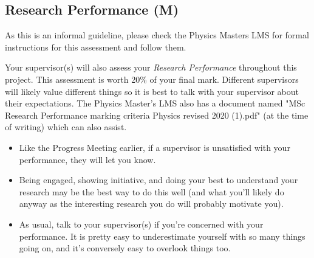 \documentclass[11pt, oneside, a4paper]{article}
\newcommand{\tipscolor}{ForestGreen}
\begin{document}
\subsection*{Research Performance (M)}\label{ResearchPerformance}

\begin{tcolorbox}[colback=red!5!white,colframe=red!50!white,title={IMPORTANT}]
    As this is an informal guideline, please check the Physics Masters LMS for formal instructions for this assessment and follow them. 
\end{tcolorbox} 

Your supervisor(s) will also assess your \textit{Research Performance} throughout this project. 
This assessment is worth 20\% of your final mark. 
Different supervisors will likely value different things so it is best to talk with your supervisor about their expectations. 
The Physics Master's LMS also has a document named "MSc Research Performance marking criteria Physics revised 2020 (1).pdf" (at the time of writing) which can also assist.


\begin{tcolorbox}[colback=\tipscolor!5!white,colframe=\tipscolor!50!white,title={Tips \& Tricks}]
    \begin{itemize}
        \item Like the Progress Meeting earlier, if a supervisor is unsatisfied with your performance, they will let you know. 
        \item Being engaged, showing initiative, and doing your best to understand your research may be the best way to do this well (and what you'll likely do anyway as the interesting research you do will probably motivate you).
        \item As usual, talk to your supervisor(s) if you're concerned with your performance. 
        It is pretty easy to underestimate yourself with so many things going on, and it's conversely easy to overlook things too. 
    \end{itemize}
\end{tcolorbox} 
\end{document}

